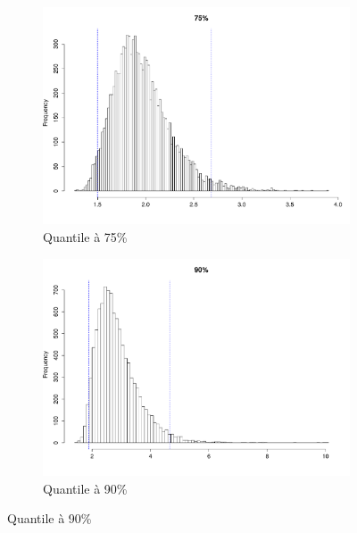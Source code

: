 \documentclass{article}
\renewcommand*{\(}{ \left( }
\renewcommand*{\)}{ \right) }
\begin{document}

\begin{figure}[H]
    \centering
    \begin{subfigure}[t]{0.3\textwidth}
        \includegraphics[width = \linewidth]{img/BootstrapParamEMV-75-30.pdf}
        \caption{Quantile à 75\%}
        \label{fig:BPEMV75} %
    \end{subfigure}%
    \begin{subfigure}[t]{0.3\textwidth}
        \includegraphics[width = \linewidth]{img/BootstrapParamEMV-90-30.pdf}
        \caption{Quantile à 90\%}
        \label{fig:BPEMV90}

\end{subfigure}
\end{figure}
\end{document}
